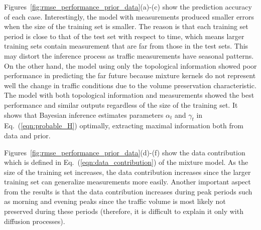 \documentclass[journal]{IEEEtran}
\begin{document}
Figures~\ref{fig:rmse_performance_prior_data}(a)-(c) show the prediction accuracy of each case. Interestingly, the model with measurements produced smaller errors when the size of the training set is smaller.
The reason is that each training set period is close to that of the test set with respect to time, which means larger training sets contain measurement that are far from those in the test sets. This may distort the inference process as traffic measurements have seasonal patterns.
On the other hand, the model using only the topological information showed poor performance in predicting the far future because mixture kernels do not represent well the change in traffic conditions due to the volume preservation characteristic.
The model with both topological information and measurements showed the best performance and similar outputs regardless of the size of the training set. 
It shows that Bayesian inference estimates parameters $\alpha_t$ and $\gamma_t$ in Eq.~(\ref{eqn:probable_H}) optimally, extracting maximal information both from data and prior.

Figures~\ref{fig:rmse_performance_prior_data}(d)-(f) show the data contribution which is defined in Eq.~(\ref{eqn:data_contribution}) of the mixture model. As the size of the training set increases, the data contribution increases since the larger training set can generalize measurements more easily. Another important aspect from the results is that the data contribution increases during peak periods such as morning and evening peaks since the traffic volume is most likely not preserved during these periods (therefore, it is difficult to explain it only with diffusion processes). 
\end{document}
